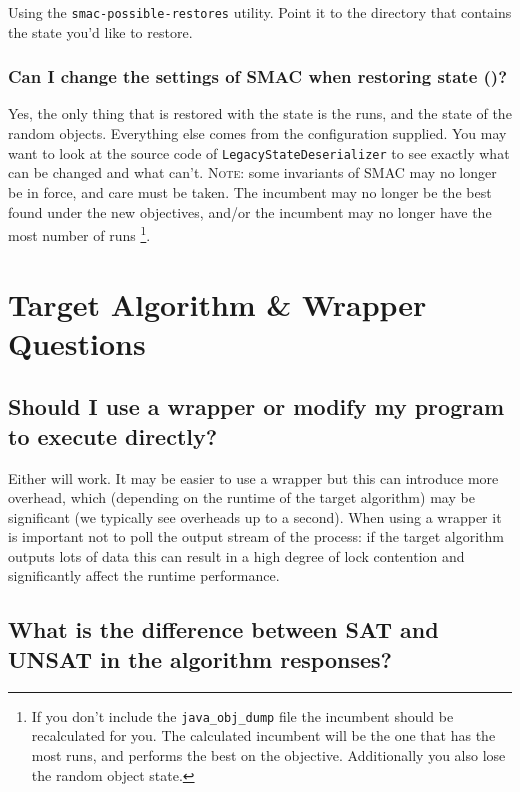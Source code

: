 \documentclass[11pt,letterpaper,oneside]{article}
\begin{document}
	Using the \texttt{smac-possible-restores} utility. Point it to the directory that contains the state you'd like to restore.

\subsubsection{Can I change the settings of SMAC when restoring state ()?}

	Yes, the only thing that is restored with the state is the runs, and the state of the random objects. Everything else comes from the configuration supplied. You may want to look at the source code of \texttt{LegacyStateDeserializer} to see exactly what can be changed and what can't. \textsc{Note:} some invariants of SMAC may no longer be in force, and care must be taken. The incumbent may no longer be the best found under the new objectives, and/or the incumbent may no longer have the most number of runs \footnote{If you don't include the \texttt{java\_obj\_dump} file the incumbent should be recalculated for you. The calculated incumbent will be the one that has the most runs, and performs the best on the objective. Additionally you also lose the random object state.}. 

\section{Target Algorithm \& Wrapper Questions}

\subsection{Should I use a wrapper or modify my program to execute directly?} 

	Either will work. It may be easier to use a wrapper but this can introduce more overhead, which (depending on the runtime of the target algorithm) may be significant (we typically see overheads up to a second). When using a wrapper it is important not to poll the output stream of the process: if the target algorithm outputs lots of data this can result in a high degree of lock contention and significantly affect the runtime performance.
	

\subsection{What is the difference between SAT and UNSAT in the algorithm responses?}
\end{document}
